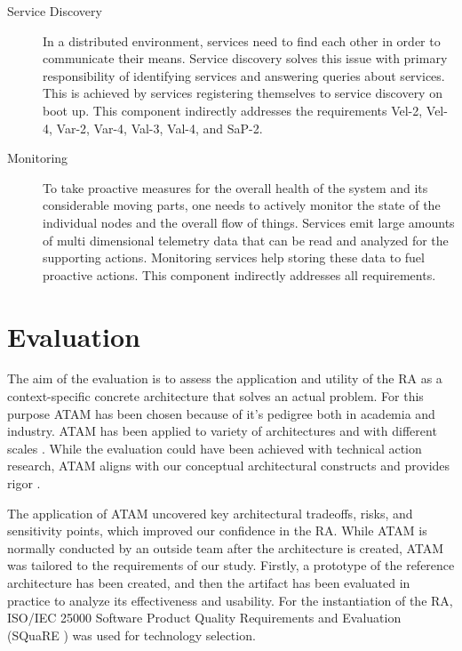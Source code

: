 \documentclass[a4paper,11pt]{article}
\let\cite\citep
\begin{document}
\begin{description}
    \item[Service Discovery] In a distributed environment, services need to find each other in order to communicate their means. Service discovery solves this issue with primary responsibility of identifying services and answering queries about services. This is achieved by services registering themselves to service discovery on boot up. This component indirectly addresses the requirements Vel-2, Vel-4, Var-2, Var-4, Val-3, Val-4, and SaP-2. 

    \item[Monitoring] To take proactive measures for the overall health of the system and its considerable moving parts, one needs to actively monitor the state of the individual nodes and the overall flow of things. Services emit large amounts of multi dimensional telemetry data that can be read and analyzed for the supporting actions. Monitoring services help storing these data to fuel proactive actions. This component indirectly addresses all requirements. 

\end{description}


\section{Evaluation}

The aim of the evaluation is to assess the application and utility of the RA as a context-specific concrete architecture that solves an actual problem. For this purpose ATAM has been chosen because of it's pedigree both in academia and industry. ATAM has been applied to variety of architectures and with different scales \cite{SoftwareArchitectureKazman}. While the evaluation could have been achieved with technical action research,  ATAM aligns with our conceptual architectural constructs and provides rigor \cite{wieringa2014design}.

The application of ATAM uncovered key architectural tradeoffs, risks, and sensitivity points, which improved our confidence in the RA. While ATAM is normally conducted by an outside team after the architecture is created, ATAM was tailored to the requirements of our study. Firstly, a prototype of the reference architecture has been created, and then the artifact has been evaluated in practice to analyze its effectiveness and usability. For the instantiation of the RA, ISO/IEC 25000 Software Product Quality Requirements and Evaluation (SQuaRE ) \cite{ISO25000} was used for technology selection. 
\end{document}
